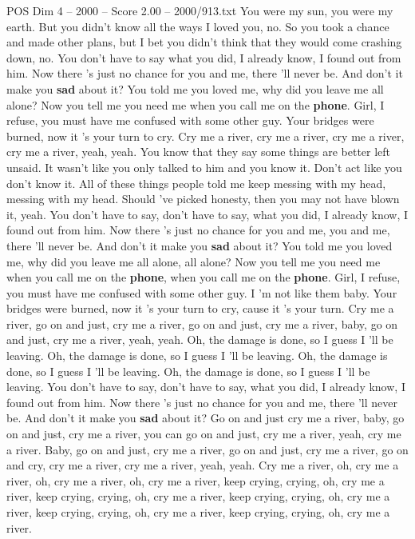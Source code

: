 \begin{textsample}{POS Dim 4 – 2000 – Score 2.00 – 2000/913.txt}  \label{ex:f4_pos_019}
You were my sun, you were my earth.
But you didn't know all the ways I loved you, no.
So you took a chance and made other plans, but I bet you didn't think that they would come crashing down, no.
You don't have to say what you did, I already know, I found out from him.
Now there 's just no chance for you and me, there 'll never be.
And don't it make you \textbf{sad} about it?
You told me you loved me, why did you leave me all alone?
Now you tell me you need me when you call me on the \textbf{phone}.
Girl, I refuse, you must have me confused with some other guy.
Your bridges were burned, now it 's your turn to cry.
Cry me a river, cry me a river, cry me a river, cry me a river, yeah, yeah.
You know that they say some things are better left unsaid.
It wasn't like you only talked to him and you know it.
Don't act like you don't know it.
All of these things people told me keep messing with my head, messing with my head.
Should 've picked honesty, then you may not have blown it, yeah.
You don't have to say, don't have to say, what you did, I already know, I found out from him.
Now there 's just no chance for you and me, you and me, there 'll never be.
And don't it make you \textbf{sad} about it?
You told me you loved me, why did you leave me all alone, all alone?
Now you tell me you need me when you call me on the \textbf{phone}, when you call me on the \textbf{phone}.
Girl, I refuse, you must have me confused with some other guy.
I 'm not like them baby.
Your bridges were burned, now it 's your turn to cry, cause it 's your turn.
Cry me a river, go on and just, cry me a river, go on and just, cry me a river, baby, go on and just, cry me a river, yeah, yeah.
Oh, the damage is done, so I guess I 'll be leaving.
Oh, the damage is done, so I guess I 'll be leaving.
Oh, the damage is done, so I guess I 'll be leaving.
Oh, the damage is done, so I guess I 'll be leaving.
You don't have to say, don't have to say, what you did, I already know, I found out from him.
Now there 's just no chance for you and me, there 'll never be.
And don't it make you \textbf{sad} about it?
Go on and just cry me a river, baby, go on and just, cry me a river, you can go on and just, cry me a river, yeah, cry me a river.
Baby, go on and just, cry me a river, go on and just, cry me a river, go on and cry, cry me a river, cry me a river, yeah, yeah.
Cry me a river, oh, cry me a river, oh, cry me a river, oh, cry me a river, keep crying, crying, oh, cry me a river, keep crying, crying, oh, cry me a river, keep crying, crying, oh, cry me a river, keep crying, crying, oh, cry me a river, keep crying, crying, oh, cry me a river.

\end{textsample}
